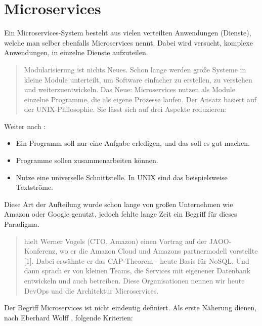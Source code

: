 \chapter{Microservices}
\label{chap:Microservices}
Ein Microservices-System besteht aus vielen verteilten Anwendungen (Dienste), welche man selber ebenfalls Microservices nennt. Dabei wird versucht, komplexe Anwendungen, in einzelne Dienste aufzuteilen.

\begin{quotation}
    \frqq Modularisierung ist nichts Neues. Schon lange werden große Systeme in kleine Module unterteilt, um Software einfacher zu erstellen, zu verstehen und weiterzuentwickeln. Das Neue: Microservices nutzen als Module einzelne Programme, die als eigene Prozesse laufen. Der Ansatz basiert auf der UNIX-Philosophie. Sie lässt sich auf drei Aspekte reduzieren:\flqq\cite[S. 2]{EWolff2016:Microservices}
\end{quotation}

Weiter nach \cite[S. 2]{EWolff2016:Microservices}:
\begin{itemize}
    \item Ein Programm soll nur eine Aufgabe erledigen, und das soll es gut machen.
    \item Programme sollen zusammenarbeiten können.
    \item Nutze eine universelle Schnittstelle. In UNIX sind das beispielsweise Textströme.
\end{itemize}

Diese Art der Aufteilung wurde schon lange von großen Unternehmen wie Amazon oder Google genutzt, jedoch fehlte lange Zeit ein Begriff für dieses Paradigma.

\begin{quotation}
     hielt Werner Vogels (CTO, Amazon) einen Vortrag auf der JAOO-Konferenz, wo er die Amazon Cloud und Amazons partnermodell vorstellte [1]. Dabei erwähnte er das CAP-Theorem - heute Basis für NoSQL. Und dann sprach er von kleinen Teams, die Services mit eigenener Datenbank entwickeln und auch betreiben. Diese Organisationen nennen wir heute DevOps und die Architektur Microservices.\flqq\ \cite[S. 1]{EWolff2016:Microservices}
\end{quotation}

Der Begriff Microservices ist nicht eindeutig definiert. Als erste Näherung dienen, nach Eberhard Wolff \cite[S. 2]{EWolff2016:Microservices}, folgende Kriterien:

